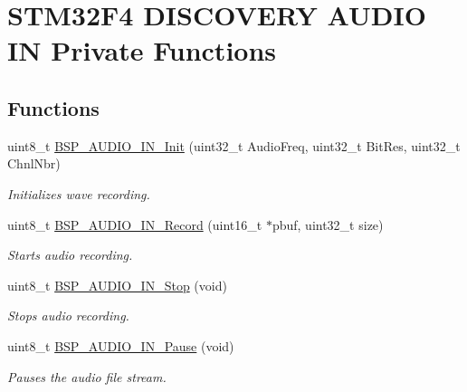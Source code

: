 \hypertarget{group___s_t_m32_f4___d_i_s_c_o_v_e_r_y___a_u_d_i_o___i_n___private___functions}{}\section{S\+T\+M32\+F4 D\+I\+S\+C\+O\+V\+E\+RY A\+U\+D\+IO IN Private Functions}
\label{group___s_t_m32_f4___d_i_s_c_o_v_e_r_y___a_u_d_i_o___i_n___private___functions}
\subsection*{Functions}
\begin{DoxyCompactItemize}
\item 
uint8\+\_\+t \mbox{\hyperlink{group___s_t_m32_f4___d_i_s_c_o_v_e_r_y___a_u_d_i_o___i_n___private___functions_ga5a40f0d40f80fd71fd16fbb4e7fb3b7d}{B\+S\+P\+\_\+\+A\+U\+D\+I\+O\+\_\+\+I\+N\+\_\+\+Init}} (uint32\+\_\+t Audio\+Freq, uint32\+\_\+t Bit\+Res, uint32\+\_\+t Chnl\+Nbr)
\begin{DoxyCompactList}\small\item\em Initializes wave recording. \end{DoxyCompactList}\item 
uint8\+\_\+t \mbox{\hyperlink{group___s_t_m32_f4___d_i_s_c_o_v_e_r_y___a_u_d_i_o___i_n___private___functions_gad09c12263c075c5e26b28e4380468c9e}{B\+S\+P\+\_\+\+A\+U\+D\+I\+O\+\_\+\+I\+N\+\_\+\+Record}} (uint16\+\_\+t $\ast$pbuf, uint32\+\_\+t size)
\begin{DoxyCompactList}\small\item\em Starts audio recording. \end{DoxyCompactList}\item 
uint8\+\_\+t \mbox{\hyperlink{group___s_t_m32_f4___d_i_s_c_o_v_e_r_y___a_u_d_i_o___i_n___private___functions_ga71122b966773b01c8a5933c76f3f12fe}{B\+S\+P\+\_\+\+A\+U\+D\+I\+O\+\_\+\+I\+N\+\_\+\+Stop}} (void)
\begin{DoxyCompactList}\small\item\em Stops audio recording. \end{DoxyCompactList}\item 
uint8\+\_\+t \mbox{\hyperlink{group___s_t_m32_f4___d_i_s_c_o_v_e_r_y___a_u_d_i_o___i_n___private___functions_gac1df7a4be23f378f89e25685a2266247}{B\+S\+P\+\_\+\+A\+U\+D\+I\+O\+\_\+\+I\+N\+\_\+\+Pause}} (void)
\begin{DoxyCompactList}\small\item\em Pauses the audio file stream. \end{DoxyCompactList}\item 

\end{DoxyCompactItemize}
